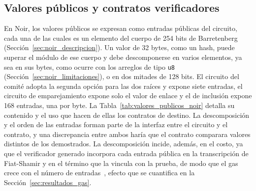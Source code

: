 \subsection{Valores públicos y contratos verificadores}
\label{sec:noir_impl_publicas}

En Noir, los valores públicos se expresan como entradas públicas del circuito, cada una de las
cuales es un elemento del cuerpo de 254 bits de Barretenberg (Sección~\ref{sec:noir_descripcion}).
Un valor de 32 bytes, como un hash, puede superar el módulo de ese cuerpo y debe descomponerse en
varios elementos, ya sea en sus bytes, como ocurre con los arreglos de tipo \lstinline|u8|
(Sección~\ref{sec:noir_limitaciones}), o en dos mitades de 128 bits. El circuito del comité adopta
la segunda opción para las dos raíces y expone siete entradas, el circuito de emparejamiento
expone solo el valor de enlace y el de inclusión expone 168 entradas, una por byte. La
Tabla~\ref{tab:valores_publicos_noir} detalla su contenido y el uso que hacen de ellas los
contratos de destino. La descomposición y el orden de las entradas forman parte de la interfaz
entre el circuito y el contrato, y una discrepancia entre ambos haría que el contrato comparara
valores distintos de los demostrados. La descomposición incide, además, en el costo, ya que el
verificador generado incorpora cada entrada pública en la transcripción de Fiat-Shamir y en el
término que la vincula con la prueba, de modo que el gas crece con el número de
entradas~\cite{barretenbergsrc}, efecto que se cuantifica en la Sección~\ref{sec:resultados_gas}.

